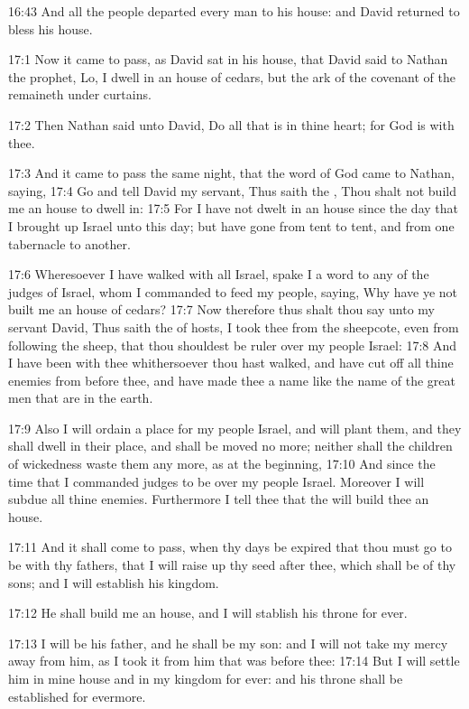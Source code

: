 16:43 And all the people departed every man to his house: and David returned to bless his house.

17:1 Now it came to pass, as David sat in his house, that David said to Nathan the prophet, Lo, I dwell in an house of cedars, but the ark of the covenant of the \LORD remaineth under curtains.

17:2 Then Nathan said unto David, Do all that is in thine heart; for God is with thee.

17:3 And it came to pass the same night, that the word of God came to Nathan, saying, 17:4 Go and tell David my servant, Thus saith the \LORD, Thou shalt not build me an house to dwell in: 17:5 For I have not dwelt in an house since the day that I brought up Israel unto this day; but have gone from tent to tent, and from one tabernacle to another.

17:6 Wheresoever I have walked with all Israel, spake I a word to any of the judges of Israel, whom I commanded to feed my people, saying, Why have ye not built me an house of cedars?  17:7 Now therefore thus shalt thou say unto my servant David, Thus saith the \LORD of hosts, I took thee from the sheepcote, even from following the sheep, that thou shouldest be ruler over my people Israel: 17:8 And I have been with thee whithersoever thou hast walked, and have cut off all thine enemies from before thee, and have made thee a name like the name of the great men that are in the earth.

17:9 Also I will ordain a place for my people Israel, and will plant them, and they shall dwell in their place, and shall be moved no more; neither shall the children of wickedness waste them any more, as at the beginning, 17:10 And since the time that I commanded judges to be over my people Israel. Moreover I will subdue all thine enemies.  Furthermore I tell thee that the \LORD will build thee an house.

17:11 And it shall come to pass, when thy days be expired that thou must go to be with thy fathers, that I will raise up thy seed after thee, which shall be of thy sons; and I will establish his kingdom.

17:12 He shall build me an house, and I will stablish his throne for ever.

17:13 I will be his father, and he shall be my son: and I will not take my mercy away from him, as I took it from him that was before thee: 17:14 But I will settle him in mine house and in my kingdom for ever: and his throne shall be established for evermore.

